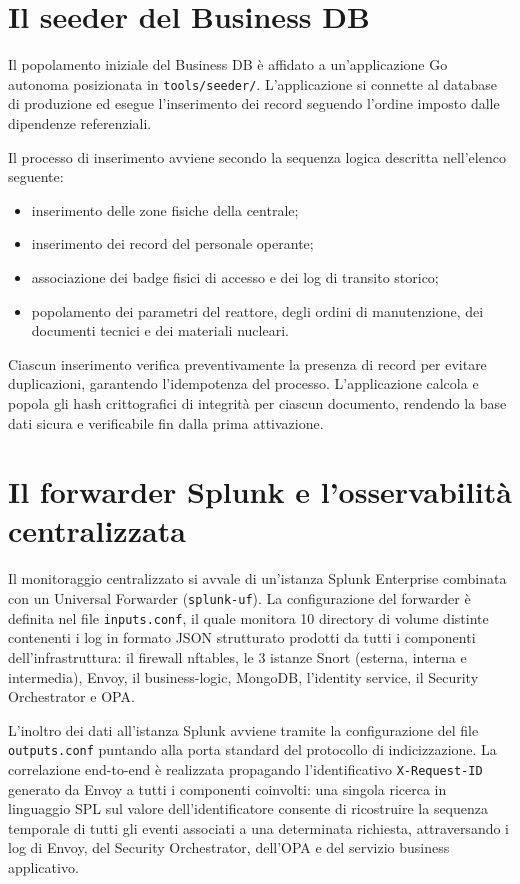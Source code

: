 \section{Il seeder del Business DB}

Il popolamento iniziale del Business DB è affidato a un'applicazione Go autonoma posizionata in \texttt{tools/seeder/}. L'applicazione si connette al database di produzione ed esegue l'inserimento dei record seguendo l'ordine imposto dalle dipendenze referenziali.

Il processo di inserimento avviene secondo la sequenza logica descritta nell'elenco seguente:

\begin{itemize}
    \item inserimento delle zone fisiche della centrale;

    \item inserimento dei record del personale operante;

    \item associazione dei badge fisici di accesso e dei log di transito storico;

    \item popolamento dei parametri del reattore, degli ordini di manutenzione, dei documenti tecnici e dei materiali nucleari.
\end{itemize}

Ciascun inserimento verifica preventivamente la presenza di record per evitare duplicazioni, garantendo l'idempotenza del processo. L'applicazione calcola e popola gli hash crittografici di integrità per ciascun documento, rendendo la base dati sicura e verificabile fin dalla prima attivazione.

\section{Il forwarder Splunk e l'osservabilità centralizzata}

Il monitoraggio centralizzato si avvale di un'istanza Splunk Enterprise combinata con un Universal Forwarder (\texttt{splunk-uf}). La configurazione del forwarder è definita nel file \texttt{inputs.conf}, il quale monitora 10 directory di volume distinte contenenti i log in formato JSON strutturato prodotti da tutti i componenti dell'infrastruttura: il firewall nftables, le 3 istanze Snort (esterna, interna e intermedia), Envoy, il business-logic, MongoDB, l'identity service, il Security Orchestrator e OPA.

L'inoltro dei dati all'istanza Splunk avviene tramite la configurazione del file \texttt{outputs.conf} puntando alla porta standard del protocollo di indicizzazione. La correlazione end-to-end è realizzata propagando l'identificativo \texttt{X-Request-ID} generato da Envoy a tutti i componenti coinvolti: una singola ricerca in linguaggio SPL sul valore dell'identificatore consente di ricostruire la sequenza temporale di tutti gli eventi associati a una determinata richiesta, attraversando i log di Envoy, del Security Orchestrator, dell'OPA e del servizio business applicativo.

